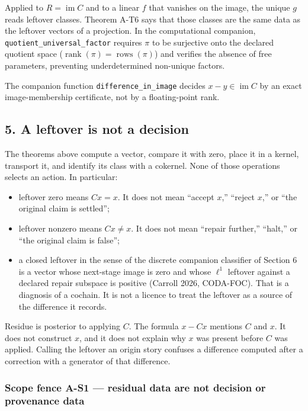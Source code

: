 \documentclass[
  11pt,
]{article}
\providecommand{\tightlist}{%
  \setlength{\itemsep}{0pt}\setlength{\parskip}{0pt}}
\begin{document}
Applied to \(R=\operatorname{im} C\) and to a linear \(f\) that vanishes on the image, the unique \(g\) reads leftover classes. Theorem A-T6 says that those classes are the same data as the leftover vectors of a projection. In the computational companion, \nolinkurl{quotient_universal_factor} requires \(\pi\) to be surjective onto the declared quotient space (\(\operatorname{rank}(\pi) = \operatorname{rows}(\pi)\)) and verifies the absence of free parameters, preventing underdetermined non-unique factors.

The companion function \nolinkurl{difference_in_image} decides \(x-y\in\operatorname{im} C\) by an exact image-membership certificate, not by a floating-point rank.

\subsection{5. A leftover is not a decision}\label{a-leftover-is-not-a-decision}

The theorems above compute a vector, compare it with zero, place it in a kernel, transport it, and identify its class with a cokernel. None of those operations selects an action. In particular:

\begin{itemize}
\tightlist
\item
  leftover zero means \(Cx=x\). It does not mean ``accept \(x\),'' ``reject \(x\),'' or ``the original claim is settled'';
\item
  leftover nonzero means \(Cx\neq x\). It does not mean ``repair further,'' ``halt,'' or ``the original claim is false'';
\item
  a closed leftover in the sense of the discrete companion classifier of Section 6 is a vector whose next-stage image is zero and whose \(\ell^1\) leftover against a declared repair subspace is positive (Carroll 2026, CODA-FOC). That is a diagnosis of a cochain. It is not a licence to treat the leftover as a source of the difference it records.
\end{itemize}

Residue is posterior to applying \(C\). The formula \(x-Cx\) mentions \(C\) and \(x\). It does not construct \(x\), and it does not explain why \(x\) was present before \(C\) was applied. Calling the leftover an origin story confuses a difference computed after a correction with a generator of that difference.

\subsubsection{Scope fence A-S1 --- residual data are not decision or provenance data}\label{scope-fence-a-s1-residual-data-are-not-decision-or-provenance-data}
\end{document}
